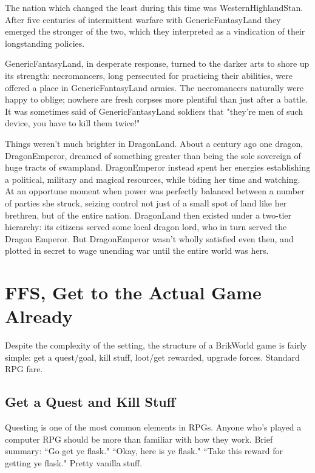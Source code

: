 \documentclass[12pt,a4paper,twocolumn]{article}
\begin{document}
The nation which changed the least during this time was WesternHighlandStan.  After five centuries of intermittent warfare with GenericFantasyLand they emerged the stronger of the two, which they interpreted as a vindication of their longstanding policies.  

GenericFantasyLand, in desperate response, turned to the darker arts to shore up its strength: necromancers, long persecuted for practicing their abilities, were offered a place in GenericFantasyLand armies.  The necromancers naturally were happy to oblige; nowhere are fresh corpses more plentiful than just after a battle.  It was sometimes said of GenericFantasyLand soldiers that "they're men of such device, you have to kill them twice!"

Things weren't much brighter in DragonLand.  About a century ago one dragon, DragonEmperor, dreamed of something greater than being the sole sovereign of huge tracts of swampland. DragonEmperor instead spent her energies establishing a political, military and magical resources, while biding her time and watching.  At an opportune moment when power was perfectly balanced between a number of parties she struck, seizing control not just of a small spot of land like her brethren, but of the entire nation.  DragonLand then existed under a two-tier hierarchy: its citizens served some local dragon lord, who in turn served the Dragon Emperor.  But DragonEmperor wasn't wholly satisfied even then, and plotted in secret to wage unending war until the entire world was hers.



\section{FFS, Get to the Actual Game Already}

Despite the complexity of the setting, the structure of a BrikWorld game is fairly simple: get a quest/goal, kill stuff, loot/get rewarded, upgrade forces.  Standard RPG fare.

\subsection{Get a Quest and Kill Stuff}

Questing is one of the most common elements in RPGs. Anyone who's played a computer RPG should be more than familiar with how they work.  Brief summary: ``Go get ye flask." ``Okay, here is ye flask." ``Take this reward for getting ye flask."  Pretty vanilla stuff.  
\end{document}
